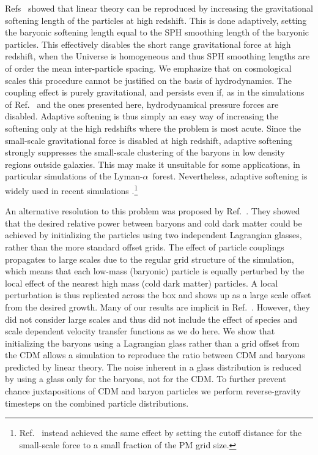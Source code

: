 \documentclass[a4paper,11pt]{article}
\newcommand{\Lya}{Lyman-$\alpha$}
\begin{document}
Refs~\cite{OLeary:2012, Angulo:2013} showed that linear theory can be reproduced by increasing the gravitational softening length of the particles at high redshift. This is done adaptively, setting the baryonic softening length equal to the SPH smoothing length of the baryonic particles. This effectively disables the short range gravitational force at high redshift, when the Universe is homogeneous and thus SPH smoothing lengths are of order the mean inter-particle spacing. We emphasize that on cosmological scales this procedure cannot be justified on the basis of hydrodynamics. The coupling effect is purely gravitational, and persists even if, as in the simulations of Ref.~\cite{Angulo:2013} and the ones presented here, hydrodynamical pressure forces are disabled. Adaptive softening is thus simply an easy way of increasing the softening only at the high redshifts where the problem is most acute. Since the small-scale gravitational force is disabled at high redshift, adaptive softening strongly suppresses the small-scale clustering of the baryons in low density regions outside galaxies. This may make it unsuitable for some applications, in particular simulations of the \Lya~forest. Nevertheless, adaptive softening is widely used in recent simulations \cite[e.g][]{Paco:2018}.\footnote{Ref.~\cite{Valkenburg:2017} instead achieved the same effect by setting the cutoff distance for the small-scale force to a small fraction of the PM grid size.}

An alternative resolution to this problem was proposed by Ref.~\cite{Yoshida:2003}. They showed that the desired relative power between baryons and cold dark matter could be achieved by initializing the particles using two independent Lagrangian glasses, rather than the more standard offset grids. The effect of particle couplings propagates to large scales due to the regular grid structure of the simulation, which means that each low-mass (baryonic) particle is equally perturbed by the local effect of the nearest high mass (cold dark matter) particles. A local perturbation is thus replicated across the box and shows up as a large scale offset from the desired growth. Many of our results are implicit in Ref.~\cite{Yoshida:2003}. However, they did not consider large scales and thus did not include the effect of species and scale dependent velocity transfer functions as we do here.
We show that initializing the baryons using a Lagrangian glass rather than a grid offset from the CDM allows a simulation to reproduce the ratio between CDM and baryons predicted by linear theory. The noise inherent in a glass distribution is reduced by using a glass only for the baryons, not for the CDM. To further prevent chance juxtapositions of CDM and baryon particles we perform reverse-gravity timesteps on the combined particle distributions.
\end{document}
